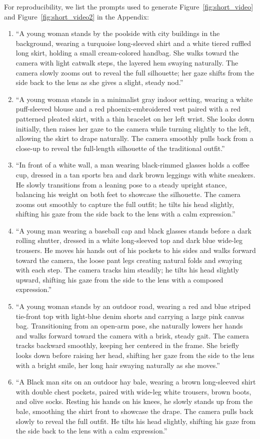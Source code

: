 \documentclass{llmxive}
\begin{document}
For reproducibility, we list the prompts used to generate Figure~\ref{fig:short_video} and Figure~\ref{fig:short_video2} in the Appendix:
\begin{enumerate}
\item ``A young woman stands by the poolside with city buildings in the background, wearing a turquoise long-sleeved shirt and a white tiered ruffled long skirt, holding a small cream-colored handbag. She walks toward the camera with light catwalk steps, the layered hem swaying naturally. The camera slowly zooms out to reveal the full silhouette; her gaze shifts from the side back to the lens as she gives a slight, steady nod.''
% 
\item ``A young woman stands in a minimalist gray indoor setting, wearing a white puff-sleeved blouse and a red phoenix-embroidered vest paired with a red patterned pleated skirt, with a thin bracelet on her left wrist. She looks down initially, then raises her gaze to the camera while turning slightly to the left, allowing the skirt to drape naturally. The camera smoothly pulls back from a close-up to reveal the full-length silhouette of the traditional outfit.''
% 
\item ``In front of a white wall, a man wearing black-rimmed glasses holds a coffee cup, dressed in a tan sports bra and dark brown leggings with white sneakers. He slowly transitions from a leaning pose to a steady upright stance, balancing his weight on both feet to showcase the silhouette. The camera zooms out smoothly to capture the full outfit; he tilts his head slightly, shifting his gaze from the side back to the lens with a calm expression.''
% 
\item ``A young man wearing a baseball cap and black glasses stands before a dark rolling shutter, dressed in a white long-sleeved top and dark blue wide-leg trousers. He moves his hands out of his pockets to his sides and walks forward toward the camera, the loose pant legs creating natural folds and swaying with each step. The camera tracks him steadily; he tilts his head slightly upward, shifting his gaze from the side to the lens with a composed expression.''
% 
\item ``A young woman stands by an outdoor road, wearing a red and blue striped tie-front top with light-blue denim shorts and carrying a large pink canvas bag. Transitioning from an open-arm pose, she naturally lowers her hands and walks forward toward the camera with a brisk, steady gait. The camera tracks backward smoothly, keeping her centered in the frame. She briefly looks down before raising her head, shifting her gaze from the side to the lens with a bright smile, her long hair swaying naturally as she moves.''
% 
\item ``A Black man sits on an outdoor hay bale, wearing a brown long-sleeved shirt with double chest pockets, paired with wide-leg white trousers, brown boots, and olive socks. Resting his hands on his knees, he slowly stands up from the bale, smoothing the shirt front to showcase the drape. The camera pulls back slowly to reveal the full outfit. He tilts his head slightly, shifting his gaze from the side back to the lens with a calm expression.''
\end{enumerate}
\end{document}
